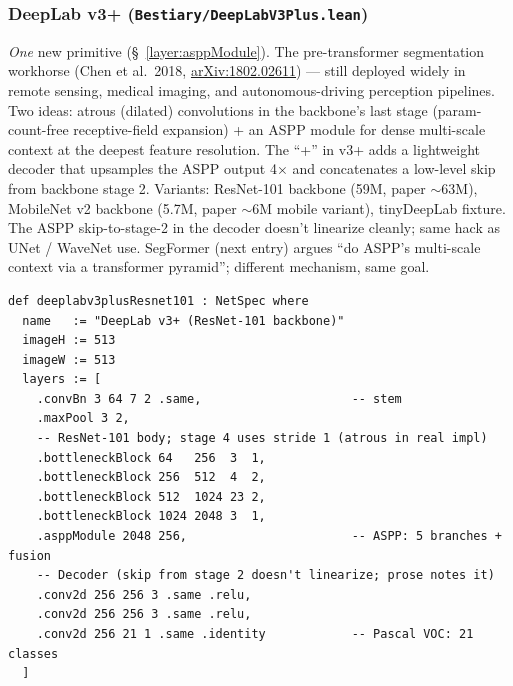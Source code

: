 \subsubsection*{DeepLab v3+ (\texttt{Bestiary/DeepLabV3Plus.lean})}
\emph{One} new primitive (\S~\ref{layer:asppModule}). The pre-transformer segmentation
workhorse (Chen et al.\ 2018,
\href{https://arxiv.org/abs/1802.02611}{arXiv:1802.02611}) --- still deployed widely in remote
sensing, medical imaging, and autonomous-driving perception
pipelines. Two ideas: atrous (dilated) convolutions in the
backbone's last stage (param-count-free receptive-field expansion)
+ an ASPP module for dense multi-scale context at the deepest
feature resolution. The ``+'' in v3+ adds a lightweight decoder that
upsamples the ASPP output 4$\times$ and concatenates a low-level skip
from backbone stage 2. Variants: ResNet-101 backbone (59M, paper
$\sim$63M), MobileNet v2 backbone (5.7M, paper $\sim$6M mobile
variant), tinyDeepLab fixture. The ASPP skip-to-stage-2 in the
decoder doesn't linearize cleanly; same hack as UNet / WaveNet use.
SegFormer (next entry) argues ``do ASPP's multi-scale context via a
transformer pyramid''; different mechanism, same goal.

\begin{verbatim}
def deeplabv3plusResnet101 : NetSpec where
  name   := "DeepLab v3+ (ResNet-101 backbone)"
  imageH := 513
  imageW := 513
  layers := [
    .convBn 3 64 7 2 .same,                     -- stem
    .maxPool 3 2,
    -- ResNet-101 body; stage 4 uses stride 1 (atrous in real impl)
    .bottleneckBlock 64   256  3  1,
    .bottleneckBlock 256  512  4  2,
    .bottleneckBlock 512  1024 23 2,
    .bottleneckBlock 1024 2048 3  1,
    .asppModule 2048 256,                       -- ASPP: 5 branches + fusion
    -- Decoder (skip from stage 2 doesn't linearize; prose notes it)
    .conv2d 256 256 3 .same .relu,
    .conv2d 256 256 3 .same .relu,
    .conv2d 256 21 1 .same .identity            -- Pascal VOC: 21 classes
  ]
\end{verbatim}

